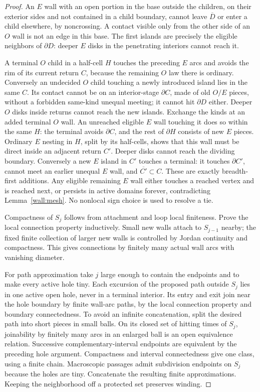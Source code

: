 \begin{proof}
An $E$ wall with an open portion in the base outside the children, on their exterior sides and not contained in a child boundary, cannot leave $\overline D$ or enter a child elsewhere, by noncrossing.  A contact visible only from the other side of an $O$ wall is not an edge in this base.  The first islands are precisely the eligible neighbors of $\partial D$: deeper $E$ disks in the penetrating interiors cannot reach it.

A terminal $O$ child in a half-cell $H$ touches the preceding $E$ arcs and avoids the rim of its current return $C$, because the remaining $O$ law there is ordinary.  Conversely an undecided $O$ child touching a newly introduced island lies in the same $C$.  Its contact cannot be on an interior-stage $\partial C$, made of old $O/E$ pieces, without a forbidden same-kind unequal meeting; it cannot hit $\partial D$ either.  Deeper $O$ disks inside returns cannot reach the new islands.  Exchange the kinds at an added terminal $O$ wall.  An unreached eligible $E$ wall touching it does so within the same $H$: the terminal avoids $\partial C$, and the rest of $\partial H$ consists of new $E$ pieces.  Ordinary $E$ nesting in $H$, split by its half-cells, shows that this wall must be direct inside an adjacent return $C'$.  Deeper disks cannot reach the dividing boundary.  Conversely a new $E$ island in $C'$ touches a terminal: it touches $\partial C'$, cannot meet an earlier unequal $E$ wall, and $\overline{C'}\subset C$.  These are exactly breadth-first additions.  Any eligible remaining $E$ wall either touches a reached vertex and is reached next, or persists in active domains forever, contradicting Lemma~\ref{wall:mesh}.  No nonlocal sign choice is used to resolve a tie.

Compactness of $S_j$ follows from attachment and loop local finiteness.  Prove the local connection property inductively.  Small new walls attach to $S_{j-1}$ nearby; the fixed finite collection of larger new walls is controlled by Jordan continuity and compactness.  This gives connections by finitely many actual wall arcs with vanishing diameter.

For path approximation take $j$ large enough to contain the endpoints and to make every active hole tiny.  Each excursion of the proposed path outside $S_j$ lies in one active open hole, never in a terminal interior.  Its entry and exit join near the hole boundary by finite wall-arc paths, by the local connection property and boundary connectedness.  To avoid an infinite concatenation, split the desired path into short pieces in small balls.  On its closed set of hitting times of $S_j$, joinability by finitely many arcs in an enlarged ball is an open equivalence relation.  Successive complementary-interval endpoints are equivalent by the preceding hole argument.  Compactness and interval connectedness give one class, using a finite chain.  Macroscopic passages admit subdivision endpoints on $S_j$ because the holes are tiny.  Concatenate the resulting finite approximations.  Keeping the neighborhood off a protected set preserves winding.
\end{proof}
